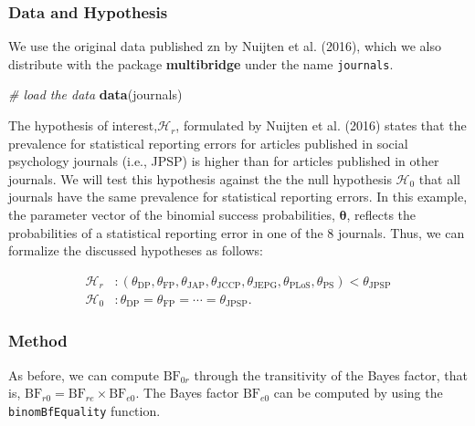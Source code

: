 \documentclass[
  english,
  man,floatsintext]{apa6}
\newenvironment{Shaded}{\begin{snugshade}}{\end{snugshade}}
\newcommand{\CommentTok}[1]{\textcolor[rgb]{0.56,0.35,0.01}{\textit{#1}}}
\newcommand{\KeywordTok}[1]{\textcolor[rgb]{0.13,0.29,0.53}{\textbf{#1}}}
\newcommand{\NormalTok}[1]{#1}
\begin{document}
\hypertarget{data-and-hypothesis-1}{%
\subsubsection{Data and Hypothesis}\label{data-and-hypothesis-1}}

We use the original data published zn by Nuijten et al. (2016), which we also distribute with the package \textbf{multibridge} under the name \texttt{journals}.

\begin{Shaded}
\begin{Highlighting}[]
\CommentTok{\# load the data}
\KeywordTok{data}\NormalTok{(journals)}
\end{Highlighting}
\end{Shaded}

The hypothesis of interest,\(\mathcal{H}_r\), formulated by Nuijten et al. (2016) states that the prevalence for statistical reporting errors for articles published in social psychology journals (i.e., JPSP) is higher than for articles published in other journals. We will test this hypothesis against the the null hypothesis \(\mathcal{H}_0\) that all journals have the same prevalence for statistical reporting errors. In this example, the parameter vector of the binomial success probabilities, \(\boldsymbol{\theta}\), reflects the probabilities of a statistical reporting error in one of the 8 journals. Thus, we can formalize the discussed hypotheses as follows:

\begin{align*}
    \mathcal{H}_r &: (\theta_{\text{DP}}, \theta_{\text{FP}}, \theta_{\text{JAP}} , \theta_{\text{JCCP}} , \theta_{\text{JEPG}} , \theta_{\text{PLoS}}, \theta_{\text{PS}}) < \theta_{\text{JPSP}} \\
    \mathcal{H}_0 &: \theta_{\text{DP}} =  \theta_{\text{FP}} =  \cdots = \theta_{\text{JPSP}}.
\end{align*}

\hypertarget{method-1}{%
\subsubsection{Method}\label{method-1}}

As before, we can compute \(\text{BF}_{0r}\) through the transitivity of the Bayes factor, that is, \(\text{BF}_{r0} = \text{BF}_{re} \times \text{BF}_{e0}\). The Bayes factor \(\text{BF}_{e0}\) can be computed by using the \texttt{binomBfEquality} function.
\end{document}
